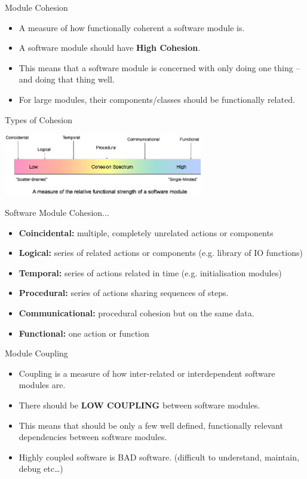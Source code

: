 \documentclass[aspectratio=1610,xcolor=dvipsnames,t,compress]{beamer}
\begin{document}
\begin{frame}{Module Cohesion} 
    \begin{itemize} 
        \item A measure of how functionally coherent a software module is.
        \item A software module should have \textbf{High Cohesion}.
        \item This means that a software module is concerned with 
              only doing one thing – and doing that thing well.
        \item For large modules, their components/classes should be functionally related.
    \end{itemize} 
\end{frame} 

\begin{frame}{Types of Cohesion} 
    \begin{center}
        \includegraphics[width=0.65\textwidth]{cohesion} 
    \end{center} 
    \begin{block}{Software Module Cohesion...}
        \begin{itemize} 
            \item \textbf{Coincidental:} multiple, completely unrelated actions or components
            \item \textbf{Logical:} series of related actions or components (e.g. library of IO functions)
            \item \textbf{Temporal:} series of actions related in time (e.g. initialisation modules) 
            \item \textbf{Procedural:} series of actions sharing sequences of steps.
            \item \textbf{Communicational:} procedural cohesion but on the same data.
            \item \textbf{Functional:} one action or function
        \end{itemize} 
    \end{block} 
\end{frame} 

\begin{frame}{Module Coupling} 
    \begin{itemize}
        \item Coupling is a measure of how inter-related or interdependent software modules are.
        \item There should be \textbf{LOW COUPLING} between software modules.
        \item This means that should be only a few well defined, 
              functionally relevant dependencies between software modules.
        \item Highly coupled software is BAD software. (difficult to understand, maintain, debug etc…)
    \end{itemize}
\end{frame} 
\end{document}
